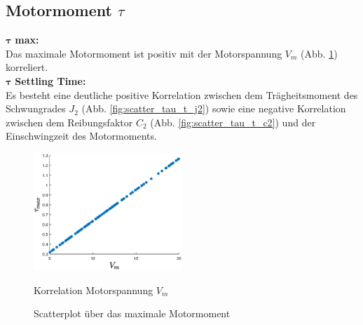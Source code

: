 \subsection*{Motormoment $\tau$}
$\bm{\tau}$ \textbf{max: }\\Das maximale Motormoment ist positiv mit der Motorspannung $V_m$ (Abb. \ref{fig:scatter_tau_vm}) korreliert.\\

$\bm{\tau}$ \textbf{Settling Time: }\\
Es besteht eine deutliche positive Korrelation zwischen dem Trägheitsmoment des Schwungrades $J_2$ (Abb. \ref{fig:scatter_tau_t_j2}) sowie eine negative Korrelation zwischen dem Reibungsfaktor $C_2$ (Abb. \ref{fig:scatter_tau_t_c2}) und der Einschwingzeit des Motormoments.\\
\begin{figure}
    \centering
        \centering
        \includegraphics[width=0.5\textwidth]{Bilder/5_sensi/cm/tau_max_vm.eps}
        \caption{Korrelation Motorspannung $V_m$}
        \label{fig:scatter_tau_vm}
    \caption{Scatterplot über das maximale Motormoment}
\end{figure}
 

